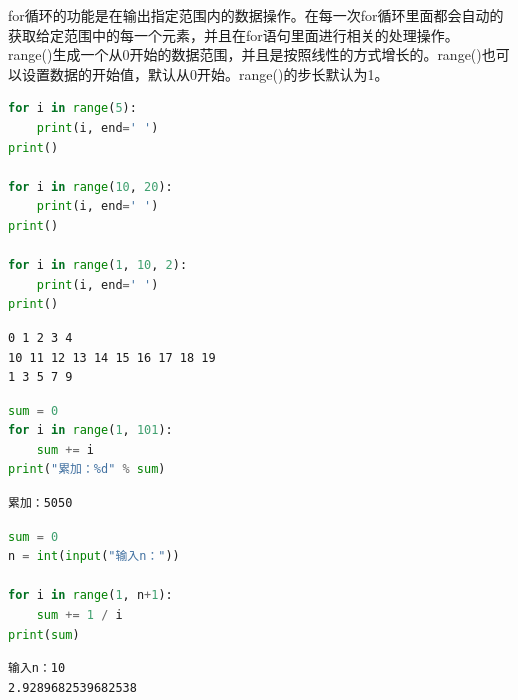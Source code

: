 for循环的功能是在输出指定范围内的数据操作。在每一次for循环里面都会自动的获取给定范围中的每一个元素，并且在for语句里面进行相关的处理操作。\\

range()生成一个从0开始的数据范围，并且是按照线性的方式增长的。range()也可以设置数据的开始值，默认从0开始。range()的步长默认为1。\\


\begin{lstlisting}[language=Python]
for i in range(5):
    print(i, end=' ')
print()

for i in range(10, 20):
    print(i, end=' ')
print()

for i in range(1, 10, 2):
    print(i, end=' ')
print()
\end{lstlisting}

\begin{tcolorbox}
    \begin{verbatim}
0 1 2 3 4 
10 11 12 13 14 15 16 17 18 19
1 3 5 7 9
\end{verbatim}
\end{tcolorbox}

\vspace{0.5cm}


\begin{lstlisting}[language=Python]
sum = 0
for i in range(1, 101):
    sum += i
print("累加：%d" % sum)
\end{lstlisting}

\begin{tcolorbox}
    \begin{verbatim}
累加：5050
\end{verbatim}
\end{tcolorbox}

\vspace{0.5cm}


\begin{lstlisting}[language=Python]
sum = 0
n = int(input("输入n："))

for i in range(1, n+1):
    sum += 1 / i
print(sum)
\end{lstlisting}

\begin{tcolorbox}
    \begin{verbatim}
输入n：10
2.9289682539682538
\end{verbatim}
\end{tcolorbox}

